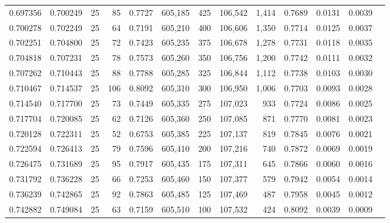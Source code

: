 \begin{tabular}{rrrrrrrrrrrrr}
0.697356 & 0.700249 &    25 &  85 &                                     0.7727 & 605,185 &     425 & 106,542 &   1,414 & 0.7689 & 0.0131 & 0.0039 \\
0.700278 & 0.702249 &    25 &  64 &                                     0.7191 & 605,210 &     400 & 106,606 &   1,350 & 0.7714 & 0.0125 & 0.0037 \\
0.702251 & 0.704800 &    25 &  72 &                                     0.7423 & 605,235 &     375 & 106,678 &   1,278 & 0.7731 & 0.0118 & 0.0035 \\
0.704818 & 0.707231 &    25 &  78 &                                     0.7573 & 605,260 &     350 & 106,756 &   1,200 & 0.7742 & 0.0111 & 0.0032 \\
0.707262 & 0.710443 &    25 &  88 &                                     0.7788 & 605,285 &     325 & 106,844 &   1,112 & 0.7738 & 0.0103 & 0.0030 \\
0.710467 & 0.714537 &    25 & 106 &                                     0.8092 & 605,310 &     300 & 106,950 &   1,006 & 0.7703 & 0.0093 & 0.0028 \\
0.714540 & 0.717700 &    25 &  73 &                                     0.7449 & 605,335 &     275 & 107,023 &     933 & 0.7724 & 0.0086 & 0.0025 \\
0.717704 & 0.720085 &    25 &  62 &                                     0.7126 & 605,360 &     250 & 107,085 &     871 & 0.7770 & 0.0081 & 0.0023 \\
0.720128 & 0.722311 &    25 &  52 &                                     0.6753 & 605,385 &     225 & 107,137 &     819 & 0.7845 & 0.0076 & 0.0021 \\
0.722594 & 0.726413 &    25 &  79 &                                     0.7596 & 605,410 &     200 & 107,216 &     740 & 0.7872 & 0.0069 & 0.0019 \\
0.726475 & 0.731689 &    25 &  95 &                                     0.7917 & 605,435 &     175 & 107,311 &     645 & 0.7866 & 0.0060 & 0.0016 \\
0.731792 & 0.736228 &    25 &  66 &                                     0.7253 & 605,460 &     150 & 107,377 &     579 & 0.7942 & 0.0054 & 0.0014 \\
0.736239 & 0.742865 &    25 &  92 &                                     0.7863 & 605,485 &     125 & 107,469 &     487 & 0.7958 & 0.0045 & 0.0012 \\
0.742882 & 0.749084 &    25 &  63 &                                     0.7159 & 605,510 &     100 & 107,532 &     424 & 0.8092 & 0.0039 & 0.0009 \\

\end{tabular}

